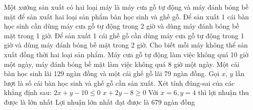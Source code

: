 \begin{ex}
 Một xưởng sản xuất có hai loại máy là máy cưa gỗ tự động và máy đánh bóng bề mặt để sản xuất hai loại sản phẩm bàn học sinh và ghế gỗ. Để sản xuất 1 cái bàn học sinh cần dùng máy cưa gỗ tự động trong 2 giờ và dùng máy đánh bóng bề mặt trong 1 giờ. Để sản xuất 1 cái ghế gỗ cần dùng máy cưa gỗ tự động trong 1 giờ và dùng máy đánh bóng bề mặt trong 2 giờ. Cho biết mỗi máy không thể sản xuất đồng thời hai loại sản phẩm. Máy cưa gỗ tự động làm việc không quá 10 giờ một ngày, máy đánh bóng bề mặt làm việc không quá 8 giờ một ngày. Một cái bàn học sinh lãi 129 ngàn đồng và một cái ghế gỗ lãi 79 ngàn đồng. Gọi ${x}$, ${y}$ lần lượt là số cái bàn học sinh và ghế gỗ cần sản xuất. Xét tính đúng-sai của các khẳng định sau:
\choiceTFt
{ \True  $2 x + y - 10 \le 0$ }
   { $x + 2 y - 8 \ge 0$ }
     { Với $x = 6, y = 4$ thì lợi nhuận thu được là lớn nhất }
    { Lợi nhuận lớn nhất đạt được là 679 ngàn đồng  }
\end{ex}

